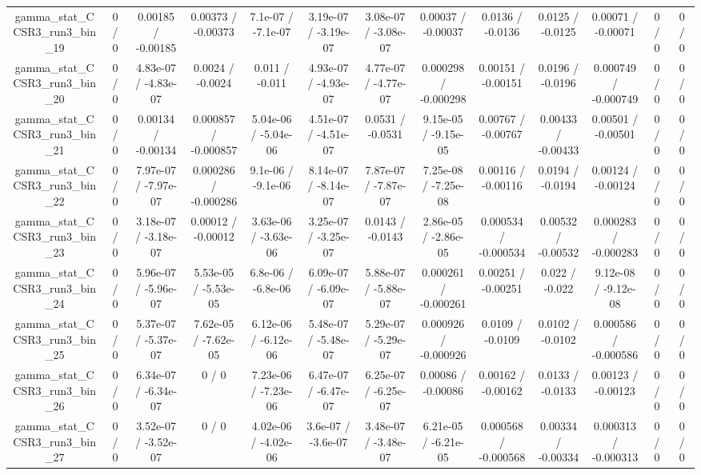 \documentclass[10pt]{article}
\begin{document}
\begin{table}[htbp]
\begin{center}
\begin{tabular}{|c|c|c|c|c|c|c|c|c|c|c|c|c|}
  gamma_stat_CCSR3_run3_bin_19 & 0 / 0 & 0.00185 / -0.00185 & 0.00373 / -0.00373 & 7.1e-07 / -7.1e-07 & 3.19e-07 / -3.19e-07 & 3.08e-07 / -3.08e-07 & 0.00037 / -0.00037 & 0.0136 / -0.0136 & 0.0125 / -0.0125 & 0.00071 / -0.00071 & 0 / 0 & 0 / 0 \\ 
  gamma_stat_CCSR3_run3_bin_20 & 0 / 0 & 4.83e-07 / -4.83e-07 & 0.0024 / -0.0024 & 0.011 / -0.011 & 4.93e-07 / -4.93e-07 & 4.77e-07 / -4.77e-07 & 0.000298 / -0.000298 & 0.00151 / -0.00151 & 0.0196 / -0.0196 & 0.000749 / -0.000749 & 0 / 0 & 0 / 0 \\ 
  gamma_stat_CCSR3_run3_bin_21 & 0 / 0 & 0.00134 / -0.00134 & 0.000857 / -0.000857 & 5.04e-06 / -5.04e-06 & 4.51e-07 / -4.51e-07 & 0.0531 / -0.0531 & 9.15e-05 / -9.15e-05 & 0.00767 / -0.00767 & 0.00433 / -0.00433 & 0.00501 / -0.00501 & 0 / 0 & 0 / 0 \\ 
  gamma_stat_CCSR3_run3_bin_22 & 0 / 0 & 7.97e-07 / -7.97e-07 & 0.000286 / -0.000286 & 9.1e-06 / -9.1e-06 & 8.14e-07 / -8.14e-07 & 7.87e-07 / -7.87e-07 & 7.25e-08 / -7.25e-08 & 0.00116 / -0.00116 & 0.0194 / -0.0194 & 0.00124 / -0.00124 & 0 / 0 & 0 / 0 \\ 
  gamma_stat_CCSR3_run3_bin_23 & 0 / 0 & 3.18e-07 / -3.18e-07 & 0.00012 / -0.00012 & 3.63e-06 / -3.63e-06 & 3.25e-07 / -3.25e-07 & 0.0143 / -0.0143 & 2.86e-05 / -2.86e-05 & 0.000534 / -0.000534 & 0.00532 / -0.00532 & 0.000283 / -0.000283 & 0 / 0 & 0 / 0 \\ 
  gamma_stat_CCSR3_run3_bin_24 & 0 / 0 & 5.96e-07 / -5.96e-07 & 5.53e-05 / -5.53e-05 & 6.8e-06 / -6.8e-06 & 6.09e-07 / -6.09e-07 & 5.88e-07 / -5.88e-07 & 0.000261 / -0.000261 & 0.00251 / -0.00251 & 0.022 / -0.022 & 9.12e-08 / -9.12e-08 & 0 / 0 & 0 / 0 \\ 
  gamma_stat_CCSR3_run3_bin_25 & 0 / 0 & 5.37e-07 / -5.37e-07 & 7.62e-05 / -7.62e-05 & 6.12e-06 / -6.12e-06 & 5.48e-07 / -5.48e-07 & 5.29e-07 / -5.29e-07 & 0.000926 / -0.000926 & 0.0109 / -0.0109 & 0.0102 / -0.0102 & 0.000586 / -0.000586 & 0 / 0 & 0 / 0 \\ 
  gamma_stat_CCSR3_run3_bin_26 & 0 / 0 & 6.34e-07 / -6.34e-07 & 0 / 0 & 7.23e-06 / -7.23e-06 & 6.47e-07 / -6.47e-07 & 6.25e-07 / -6.25e-07 & 0.00086 / -0.00086 & 0.00162 / -0.00162 & 0.0133 / -0.0133 & 0.00123 / -0.00123 & 0 / 0 & 0 / 0 \\ 
  gamma_stat_CCSR3_run3_bin_27 & 0 / 0 & 3.52e-07 / -3.52e-07 & 0 / 0 & 4.02e-06 / -4.02e-06 & 3.6e-07 / -3.6e-07 & 3.48e-07 / -3.48e-07 & 6.21e-05 / -6.21e-05 & 0.000568 / -0.000568 & 0.00334 / -0.00334 & 0.000313 / -0.000313 & 0 / 0 & 0 / 0 \\ 

\end{tabular}
\end{center}
\end{table}
\end{document}

